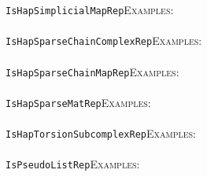 \documentclass[a4paper,11pt]{report}
\begin{document}
{{ \texttt{IsHapSimplicialMapRep}{\nobreakspace}{\nobreakspace}{\nobreakspace}{\nobreakspace}\textsc{Examples:} \\
 \\
 \texttt{IsHapSparseChainComplexRep}{\nobreakspace}{\nobreakspace}{\nobreakspace}{\nobreakspace}\textsc{Examples:} \\
 \\
 \texttt{IsHapSparseChainMapRep}{\nobreakspace}{\nobreakspace}{\nobreakspace}{\nobreakspace}\textsc{Examples:} \\
 \\
 \texttt{IsHapSparseMatRep}{\nobreakspace}{\nobreakspace}{\nobreakspace}{\nobreakspace}\textsc{Examples:} \\
 \\
 \texttt{IsHapTorsionSubcomplexRep}{\nobreakspace}{\nobreakspace}{\nobreakspace}{\nobreakspace}\textsc{Examples:} \\
 \\
 \texttt{IsPseudoListRep}{\nobreakspace}{\nobreakspace}{\nobreakspace}{\nobreakspace}\textsc{Examples:} \\
 \\
}}
\end{document}
